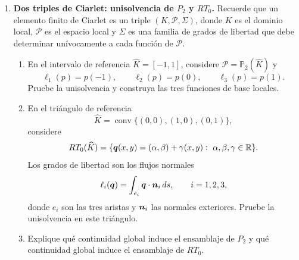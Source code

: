 \documentclass[11pt]{article}
\theoremstyle{thmstyle}
\def\vec   #1{\mbox{\boldmath $#1$}{}}
\begin{document}
\begin{enumerate}[label=\textbf{\arabic*.}, leftmargin=*]
    \item \textbf{Dos triples de Ciarlet: unisolvencia de $P_2$ y $RT_0$.} Recuerde que un elemento finito de Ciarlet es un triple $(K,\mathcal P,\Sigma)$, donde $K$ es el dominio local, $\mathcal P$ es el espacio local y $\Sigma$ es una familia de grados de libertad que debe determinar un\'ivocamente a cada funci\'on de $\mathcal P$.
    \begin{enumerate}[label=(\alph*)]
        \item En el intervalo de referencia $\widehat K=[-1,1]$, considere $\mathcal P=\mathbb P_2(\widehat K)$ y
        \begin{equation*}
            \ell_1(p)=p(-1),\qquad \ell_2(p)=p(0),\qquad \ell_3(p)=p(1).
        \end{equation*}
        Pruebe la unisolvencia y construya las tres funciones de base locales.

        \item En el tri\'angulo de referencia
        \begin{equation*}
            \widehat K=\operatorname{conv}\{(0,0),(1,0),(0,1)\},
        \end{equation*}
        considere
        \begin{equation*}
            RT_0(\widehat K)=\{\vec q(x,y)=(\alpha,\beta)+\gamma(x,y):\ \alpha,\beta,\gamma\in\mathbb R\}.
        \end{equation*}
        Los grados de libertad son los flujos normales
        \begin{equation*}
            \ell_i(\vec q)=\int_{e_i}\vec q\cdot\vec n_i\,ds,
            \qquad i=1,2,3,
        \end{equation*}
        donde $e_i$ son las tres aristas y $\vec n_i$ las normales exteriores. Pruebe la unisolvencia en este tri\'angulo.

        \item Explique qu\'e continuidad global induce el ensamblaje de $P_2$ y qu\'e continuidad global induce el ensamblaje de $RT_0$.
    \end{enumerate}


\end{enumerate}
\end{document}
